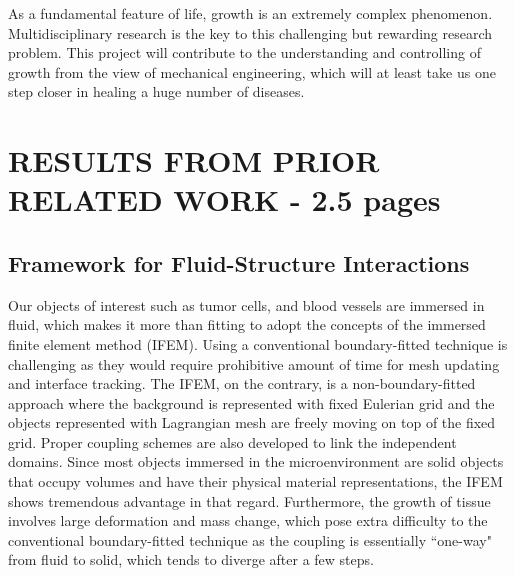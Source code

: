 \documentclass[12pt]{article}
\begin{document}
As a fundamental feature of life, growth is an extremely complex phenomenon. Multidisciplinary research is the key to this challenging but rewarding research problem. This project will contribute to the understanding and controlling of growth from the view of mechanical engineering, which will at least take us one step closer in healing a huge number of diseases.

\section{RESULTS FROM PRIOR RELATED WORK - 2.5 pages}

\subsection{Framework for Fluid-Structure Interactions}
Our objects of interest such as tumor cells, and blood vessels are immersed in fluid, which makes it more than fitting to adopt the concepts of the immersed finite element method (IFEM). Using a conventional boundary-fitted technique is challenging as they would require prohibitive amount of time for mesh updating and interface tracking. The IFEM, on the contrary, is a non-boundary-fitted approach where the background is represented with fixed Eulerian grid and the objects represented with Lagrangian mesh are freely moving on top of the fixed grid. Proper coupling schemes are also developed to link the independent domains. Since most objects immersed in the microenvironment are solid objects that occupy volumes and have their physical material representations, the IFEM shows tremendous advantage in that regard. Furthermore, the growth of tissue involves large deformation and mass change, which pose extra difficulty to the conventional boundary-fitted technique as the coupling is essentially ``one-way"  from fluid to solid, which tends to diverge after a few steps.
\end{document}
